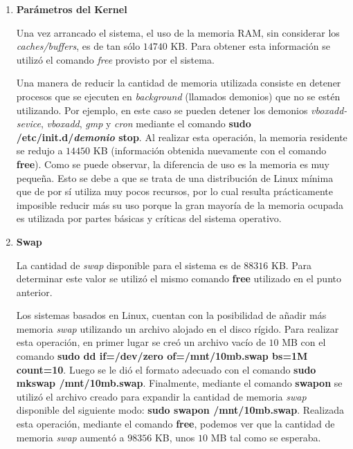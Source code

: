 \documentclass[a4paper,11pt] {article}
\begin{document}
\begin{enumerate}
    Para verificar el uso del CPU por parte de cada uno de los procesos se utiliz\'o el comando \textbf{top}. De esta manera se obtuvieron los siguientes resultados:
    \begin{itemize}
      \item \textit{loop1}: 3.3\%
      \item \textit{loop2}: 3.3\%
      \item \textit{loop3}: 93.1\%
    \end{itemize}

  \item \textbf{Parámetros del Kernel}

	Una vez arrancado el sistema, el uso de la memoria RAM, sin considerar los \textit{caches/buffers}, es de tan sólo $14740$ KB. Para obtener esta información se utilizó el comando \textit{free} provisto por el sistema. 

	Una manera de reducir la cantidad de memoria utilizada consiste en detener procesos que se ejecuten en \textit{background} (llamados demonios) que no se estén utilizando. Por ejemplo, en este caso se pueden detener los demonios \textit{vboxadd-sevice}, \textit{vboxadd}, \textit{gmp} y \textit{cron} mediante el comando \textbf{sudo /etc/init.d/\textit{demonio} stop}. Al realizar esta operación, la memoria residente se redujo a $14450$ KB (información obtenida nuevamente con el comando \textbf{free}). Como se puede observar, la diferencia de uso es la memoria es muy pequeña. Esto se debe a que se trata de una distribución de Linux mínima que de por sí utiliza muy pocos recursos, por lo cual resulta prácticamente imposible reducir más su uso porque la gran mayoría de la memoria ocupada es utilizada por partes básicas y críticas del sistema operativo.

  \item \textbf{Swap}

	La cantidad de \textit{swap} disponible para el sistema es de $88316$ KB. Para determinar este valor se utilizó el mismo comando \textbf{free} utilizado en el punto anterior.

	Los sistemas basados en Linux, cuentan con la posibilidad de añadir más memoria \textit{swap} utilizando un archivo alojado en el disco rígido. Para realizar esta operación, en primer lugar se creó un archivo vacío de $10$ MB con el comando \textbf{sudo dd if=/dev/zero of=/mnt/10mb.swap bs=1M count=10}. Luego se le dió el formato adecuado con el comando \textbf{sudo mkswap /mnt/10mb.swap}. Finalmente, mediante el comando \textbf{swapon} se utilizó el archivo creado para expandir la cantidad de memoria \textit{swap} disponible del siguiente modo: \textbf{sudo swapon /mnt/10mb.swap}. Realizada esta operación, mediante el comando \textbf{free}, podemos ver que la cantidad de memoria \textit{swap} aumentó a $98356$ KB, unos $10$ MB tal como se esperaba.


\end{enumerate}
\end{document}
